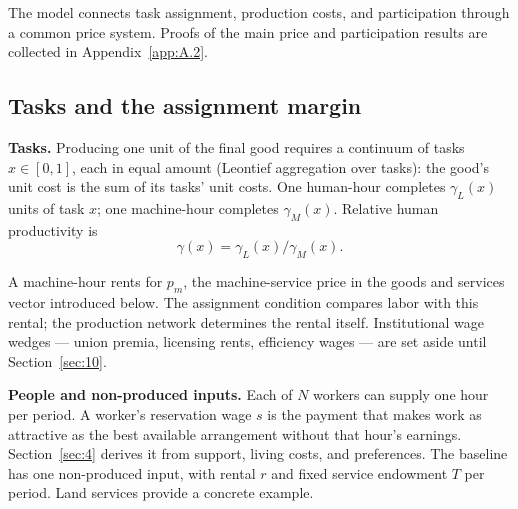 \documentclass[12pt]{article}
\theoremstyle{plain}
\begin{document}
The model connects task assignment, production costs, and participation through a common price system. Proofs of the main price and participation results are collected in Appendix~\ref{app:A.2}.

\subsection{Tasks and the assignment margin}\label{sec:3.1}

\textbf{Tasks.} Producing one unit of the final good requires a continuum of tasks
$x \in [0,1]$, each in equal amount (Leontief aggregation over tasks): the good's
unit cost is the sum of its tasks' unit costs. One human-hour completes
$\gamma_L(x)$ units of task $x$; one machine-hour completes $\gamma_M(x)$.
Relative human productivity is
\begin{equation}\label{eq:1}
\gamma(x) = \gamma_L(x) / \gamma_M(x).
\end{equation}

A machine-hour rents for $p_m$, the machine-service price in the goods and services vector introduced below. The assignment condition compares labor with this rental; the production network determines the rental itself. Institutional wage wedges
--- union premia, licensing rents, efficiency wages --- are set aside until
Section~\ref{sec:10}.

\textbf{People and non-produced inputs.} Each of $N$ workers can supply one hour per period. A worker's reservation wage $s$ is the payment that makes work as attractive as the best available arrangement without that hour's earnings. Section~\ref{sec:4} derives it from support, living costs, and preferences. The baseline has one non-produced input, with rental $r$ and fixed service endowment $T$ per period. Land services provide a concrete example.
\end{document}
